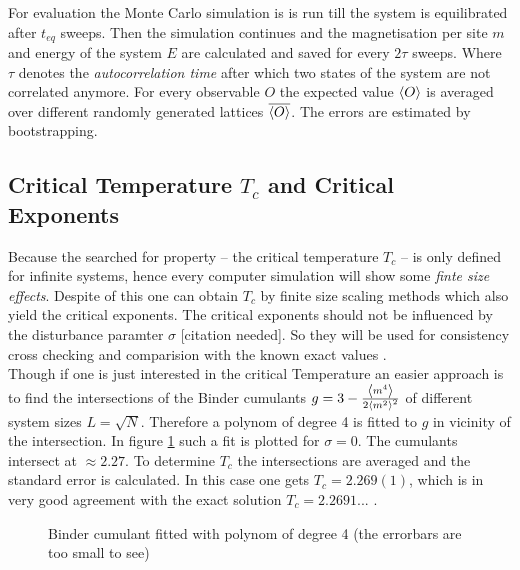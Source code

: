     For evaluation the Monte Carlo simulation is is run till the system
    is equilibrated after \(t_{eq}\) sweeps. Then the simulation continues
    and the magnetisation per site \(m\) and energy of the system \(E\)
    are calculated and saved for every \(2\tau\) sweeps. Where \(\tau\)
    denotes the \emph{autocorrelation time} after which two states of
    the system are not correlated anymore.
    For every observable \(O\) the expected value \(\left< O \right>\) is averaged
    over different randomly generated lattices \(\overline{\left< O \right>}\). The
    errors are estimated by bootstrapping.

\subsection{Critical Temperature $T_c$ and Critical Exponents}
\label{ssec:finitesize}
    Because the searched for property -- the critical temperature \(T_c\)
    -- is only defined for infinite systems, hence every computer
    simulation will show some \emph{finte size effects}.
    Despite of this one can obtain \(T_c\) by finite size scaling
    methods \cite[S. ??]{Newman1998} which also yield the critical
    exponents. The critical exponents should not be influenced by the
    disturbance paramter \(\sigma\) [citation needed]. So they will be
    used for consistency cross checking and comparision with the known
    exact values \cite[S. 59]{Pelissetto2002}.\\
    Though if one is just interested in the critical Temperature an
    easier approach is to find the intersections of the Binder cumulants
    \(g = 3-\frac{\left< m^4 \right>}{2\left< m^2 \right>^2}\) \cite{Binder1981} of different
    system sizes \(L=\sqrt N\).
    Therefore a polynom of degree 4 is fitted to \(g\) in vicinity of
    the intersection.
    In figure \ref{fig:binder_fit_s_0} such a fit is plotted for
    \(\sigma=0\). The cumulants intersect at \(\approx 2.27\).
    To determine \(T_c\) the intersections are averaged and the standard
    error is calculated. In this case one gets \(T_c = 2.269(1)\), which
    is in very good agreement with the exact solution
    \(T_c = 2.2691...\) \cite{Onsager1944}.\\
    \begin{figure}[htbp]
        \centering
        \caption[Binder cumulant fitted with polynom of degree 4]
                {Binder cumulant fitted with polynom of degree 4
                (the errorbars are too small to see)}
        \label{fig:binder_fit_s_0}
    \end{figure}%

